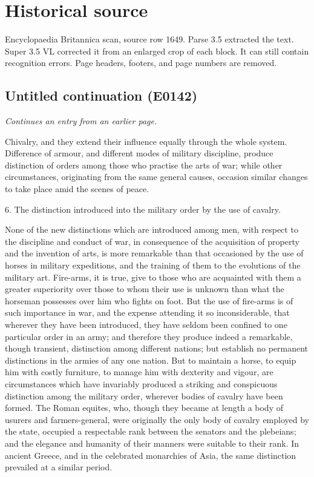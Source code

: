 \documentclass{article}
\begin{document}
\section*{Historical source}
Encyclopaedia Britannica scan, source row 1649. Parse 3.5 extracted the text. Super 3.5 VL corrected it from an enlarged crop of each block. It can still contain recognition errors.
Page headers, footers, and page numbers are removed.

\subsection*{Untitled continuation (E0142)}
\textit{Continues an entry from an earlier page.}

Chivalry, and they extend their influence equally through the whole system. Difference of armour, and different modes of military discipline, produce distinction of orders among those who practise the arts of war; while other circumstances, originating from the same general causes, occasion similar changes to take place amid the scenes of peace.

6. The distinction introduced into the military order by the use of cavalry.

None of the new distinctions which are introduced among men, with respect to the discipline and conduct of war, in consequence of the acquisition of property and the invention of arts, is more remarkable than that occasioned by the use of horses in military expeditions, and the training of them to the evolutions of the military art. Fire-arms, it is true, give to those who are acquainted with them a greater superiority over those to whom their use is unknown than what the horseman possesses over him who fights on foot. But the use of fire-arms is of such importance in war, and the expense attending it so inconsiderable, that wherever they have been introduced, they have seldom been confined to one particular order in an army; and therefore they produce indeed a remarkable, though transient, distinction among different nations; but establish no permanent distinctions in the armies of any one nation. But to maintain a horse, to equip him with costly furniture, to manage him with dexterity and vigour, are circumstances which have invariably produced a striking and conspicuous distinction among the military order, wherever bodies of cavalry have been formed. The Roman equites, who, though they became at length a body of usurers and farmers-general, were originally the only body of cavalry employed by the state, occupied a respectable rank between the senators and the plebeians; and the elegance and humanity of their manners were suitable to their rank. In ancient Greece, and in the celebrated monarchies of Asia, the same distinction prevailed at a similar period.
\end{document}
